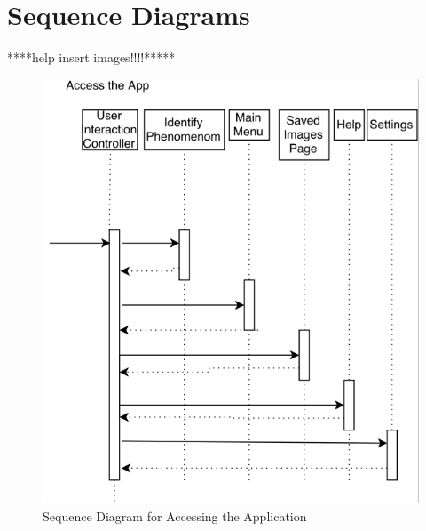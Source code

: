 \documentclass[]{article}
\begin{document}
\section{Sequence Diagrams}
\label{sec:sequence_diagrams}
****help insert images!!!!*****
\begin{figure}[!hb]
	\includegraphics[width=\linewidth]{sequenceDiagram1.png}
	\caption{Sequence Diagram for Accessing the Application}
\end{figure}
\end{document}
